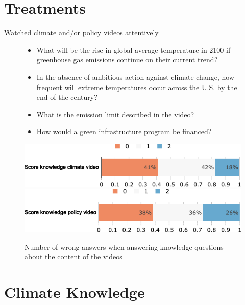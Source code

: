 \documentclass[aspectratio=169,9pt,dvipsnames]{beamer}
\begin{document}
\section{Treatments}

\begin{frame}{Watched climate and/or policy videos attentively}%
\begin{figure}[h!]
\centering
\caption{Number of wrong answers when answering knowledge questions about the content of the videos}
\footnotesize \begin{itemize}
\item What will be the rise in global average temperature in 2100 if greenhouse gas emissions continue on their current trend?
\item In the absence of ambitious action against climate change, how frequent will extreme temperatures occur across the U.S. by the end of the century?
\item What is the emission limit described in the video? 
\item How would a green infrastructure program be financed?
\end{itemize}

\includegraphics[width=.7\textwidth]{../figures/US/know_treatment_climate_US.png} \\
\vspace{.5cm}
\includegraphics[width=.7\textwidth]{../figures/US/know_treatment_policy_US.png}
\end{figure}
\end{frame}


\section{Climate Knowledge}
\end{document}
